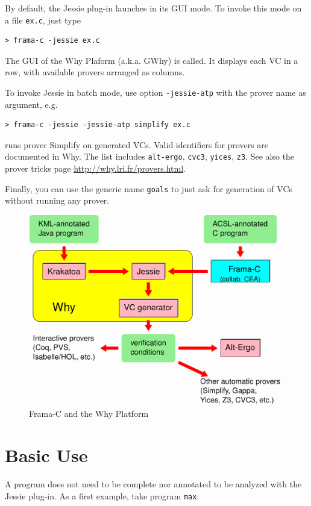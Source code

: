 \documentclass[a4paper,11pt,twoside,openright]{report}
\begin{document}
By default, the Jessie plug-in launches in its GUI mode. To invoke this
mode on a file \verb|ex.c|, just type

\begin{verbatim}
> frama-c -jessie ex.c
\end{verbatim}

The GUI of the Why Plaform (a.k.a. GWhy) is called. It displays each VC in a row, with available provers arranged as columns.

To invoke Jessie in batch mode, use option \verb|-jessie-atp| with the prover name as argument, e.g.
\begin{verbatim}
> frama-c -jessie -jessie-atp simplify ex.c
\end{verbatim}
runs prover Simplify on generated VCs. Valid identifiers for
provers are documented in Why. The list includes \verb|alt-ergo|,
\verb|cvc3|, \verb|yices|, \verb|z3|. See also the prover tricks page
\url{http://why.lri.fr/provers.html}.

Finally, you can use the generic name \verb|goals| to just ask for
generation of VCs without running any prover.

\begin{figure}[t]
  \begin{center}
    \includegraphics[width=0.8\linewidth]{why_frama_c-mps3.png}
  \end{center}
  \caption{Frama-C and the Why Platform}
  \label{fig:platform}
\hrulefill
\end{figure}


\section{Basic Use}

A program does not need to be complete nor annotated to be analyzed
with the Jessie plug-in. As a first example, take program \verb|max|:
\end{document}
